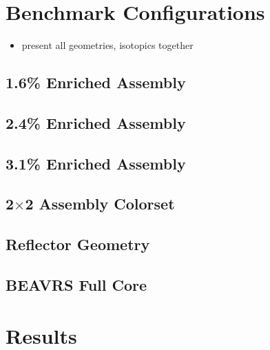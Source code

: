 \section{Benchmark Configurations}
\label{sec:chap7-benchmarks}

\begin{itemize}[noitemsep]
  \item present all geometries, isotopics together
\end{itemize}

\subsection{1.6\% Enriched Assembly}

\subsection{2.4\% Enriched Assembly}

\subsection{3.1\% Enriched Assembly}

\subsection{2$\times$2 Assembly Colorset}

\subsection{Reflector Geometry}

\subsection{BEAVRS Full Core}


\section{Results}

